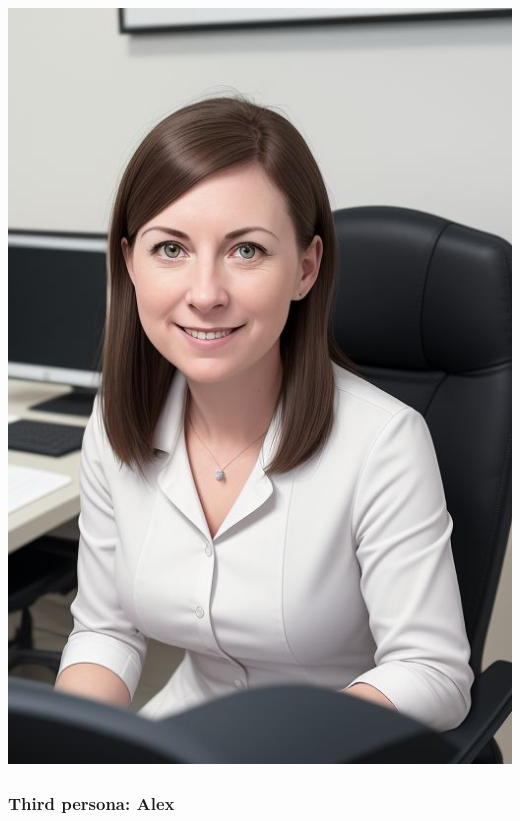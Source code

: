 \begin{minipage}[t]{0.3\textwidth} %
	\vspace{0pt} %
	\centering
	\vspace{0pt}
	\includegraphics[width=\textwidth]{../Draw.io diagrams/emily.jpeg}
\end{minipage}%
\clearpage
\subsubsection{Third persona: Alex}

